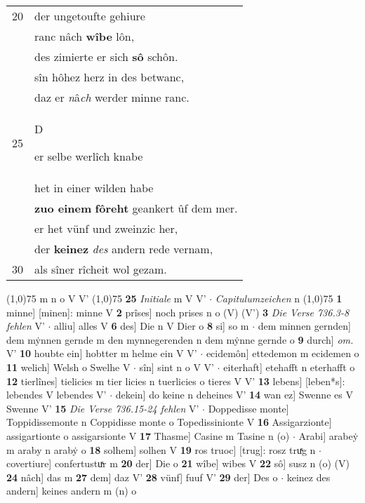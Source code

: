 \documentclass[8pt,a4paper,notitlepage]{article}
\begin{document}
\begin{table}[ht]
\begin{minipage}[t]{0.5\linewidth}
\begin{tabular}{rl}
20 & der ungetoufte gehiure\\ 
 & ranc nâch \textbf{wîbe} lôn,\\ 
 & des zimierte er sich \textbf{sô} schôn.\\ 
 & sîn hôhez herz in des betwanc,\\ 
 & daz er \textit{n}â\textit{ch} werder minne ranc.\\ 
25 & \begin{large}D\end{large}er selbe werlîch knabe\\ 
 & het in einer wilden habe\\ 
 & \textbf{zuo einem} \textbf{fôreht} geankert ûf dem mer.\\ 
 & er het vünf und zweinzic her,\\ 
 & der \textbf{keinez} \textit{des} andern rede vernam,\\ 
30 & als sîner rîcheit wol gezam.\\ 
\end{tabular}
\scriptsize
\line(1,0){75} \newline
m n o V V' \newline
\line(1,0){75} \newline
\textbf{25} \textit{Initiale} m V V'   $\cdot$ \textit{Capitulumzeichen} n  \newline
\line(1,0){75} \newline
\textbf{1} minne] [minen]: minne V \textbf{2} prîses] noch prises n o (V) (V') \textbf{3} \textit{Die Verse 736.3-8 fehlen } V'   $\cdot$ alliu] alles V \textbf{6} des] Die n V Dier o \textbf{8} si] so m  $\cdot$ dem minnen gernden] dem mẏnnen gernde m den mynnegerenden n dem mẏnne gernde o \textbf{9} durch] \textit{om.} V' \textbf{10} houbte ein] hobtter m helme ein V V'  $\cdot$ ecidemôn] ettedemon m ecidemen o \textbf{11} welich] Welsh o Swelhe V  $\cdot$ sîn] sint n o V V'  $\cdot$ eiterhaft] etehafft n eterhafft o \textbf{12} tierlînes] tielicies m tier licies n tuerlicies o tieres V V' \textbf{13} lebens] [leben*s]: lebendes V lebendes V'  $\cdot$ dekein] do keine n deheines V' \textbf{14} wan ez] Swenne es V Swenne V' \textbf{15} \textit{Die Verse 736.15-24 fehlen} V'   $\cdot$ Doppedisse monte] Toppidissemonte n Coppidisse monte o Topedissinionte V \textbf{16} Assigarzionte] assigartionte o assigarsionte V \textbf{17} Thasme] Casine m Tasine n (o)  $\cdot$ Arabi] arabeẏ m araby n arabẏ o \textbf{18} solhem] solhen V \textbf{19} ros truoc] [trug]: rosz truͯg n  $\cdot$ covertiure] confertustuͯr m \textbf{20} der] Die o \textbf{21} wîbe] wibes V \textbf{22} sô] susz n (o) (V) \textbf{24} nâch] das m \textbf{27} dem] daz V' \textbf{28} vünf] fuuf V' \textbf{29} der] Des o  $\cdot$ keinez des andern] keines andern m (n) o \newline
\end{minipage}
\end{table}
\end{document}
